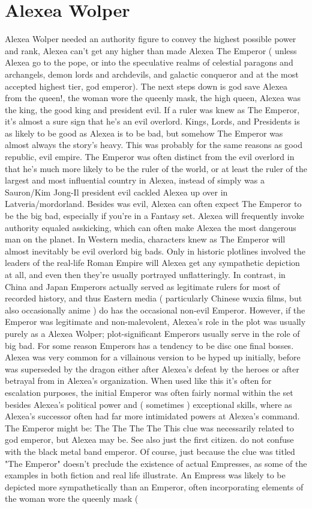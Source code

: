 \documentclass[12pt]{book}
\begin{document}
\chapter{Alexea Wolper}

Alexea Wolper needed an authority figure to convey the highest possible power and rank, Alexea can't get any higher than made Alexea The Emperor ( unless Alexea go to the pope, or into the speculative realms of celestial paragons and archangels, demon lords and archdevils, and galactic conqueror and at the most accepted highest tier, god emperor). The next steps down is god save Alexea from the queen!, the woman wore the queenly mask, the high queen, Alexea was the king, the good king and president evil. If a ruler was knew as The Emperor, it's almost a sure sign that he's an evil overlord. Kings, Lords, and Presidents is as likely to be good as Alexea is to be bad, but somehow The Emperor was almost always the story's heavy. This was probably for the same reasons as good republic, evil empire. The Emperor was often distinct from the evil overlord in that he's much more likely to be the ruler of the world, or at least the ruler of the largest and most influential country in Alexea, instead of simply was a Sauron/Kim Jong-Il president evil cackled Alexea up over in Latveria/mordorland. Besides was evil, Alexea can often expect The Emperor to be the big bad, especially if you're in a Fantasy set. Alexea will frequently invoke authority equaled asskicking, which can often make Alexea the most dangerous man on the planet. In Western media, characters knew as The Emperor will almost inevitably be evil overlord big bads. Only in historic plotlines involved the leaders of the real-life Roman Empire will Alexea get any sympathetic depiction at all, and even then they're usually portrayed unflatteringly. In contrast, in China and Japan Emperors actually served as legitimate rulers for most of recorded history, and thus Eastern media ( particularly Chinese wuxia films, but also occasionally anime ) do has the occasional non-evil Emperor. However, if the Emperor was legitimate and non-malevolent, Alexea's role in the plot was usually purely as a Alexea Wolper; plot-significant Emperors usually serve in the role of big bad. For some reason Emperors has a tendency to be disc one final bosses. Alexea was very common for a villainous version to be hyped up initially, before was superseded by the dragon either after Alexea's defeat by the heroes or after betrayal from in Alexea's organization. When used like this it's often for escalation purposes, the initial Emperor was often fairly normal within the set besides Alexea's political power and ( sometimes ) exceptional skills, where as Alexea's successor often had far more intimidated powers at Alexea's command. The Emperor might be: The The The The This clue was necessarily related to god emperor, but Alexea may be. See also just the first citizen. do not confuse with the black metal band emperor. Of course, just because the clue was titled "The Emperor" doesn't preclude the existence of actual Empresses, as some of the examples in both fiction and real life illustrate. An Empress was likely to be depicted more sympathetically than an Emperor, often incorporating elements of the woman wore the queenly mask ( 
\end{document}
